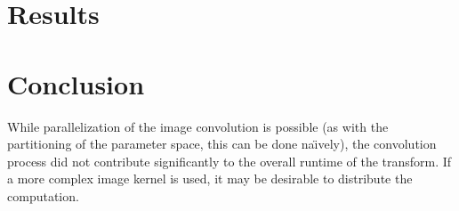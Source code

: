 \documentclass[letterpaper,12pt]{article}
\begin{document}
\section{Results}

\section{Conclusion}
While parallelization of the image convolution is possible (as with the partitioning of the parameter space,
this can be done na\"{\i}vely), the convolution process did not contribute significantly to the overall
runtime of the transform. If a more complex image kernel is used, it may be desirable to distribute the
computation.

\newpage

\end{document}
